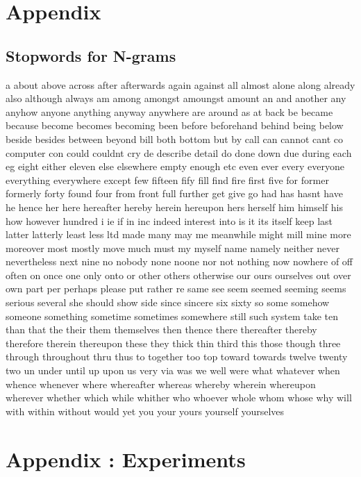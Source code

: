 
\renewcommand{\theequation}{B\arabic{equation}}
\setcounter{equation}{0}
\renewcommand{\thefigure}{B\arabic{figure}}
\setcounter{figure}{0}
\renewcommand{\thetable}{B\arabic{table}}
\setcounter{table}{0}


\clearpage

\thesisappendix

\section{Appendix \label{A}}


\subsection{Stopwords for N-grams}
\label{sec:appendix-stopwords}

a
about
above
across
after
afterwards
again
against
all
almost
alone
along
already
also
although
always
am
among
amongst
amoungst
amount
an
and
another
any
anyhow
anyone
anything
anyway
anywhere
are
around
as
at
back
be
became
because
become
becomes
becoming
been
before
beforehand
behind
being
below
beside
besides
between
beyond
bill
both
bottom
but
by
call
can
cannot
cant
co
computer
con
could
couldnt
cry
de
describe
detail
do
done
down
due
during
each
eg
eight
either
eleven
else
elsewhere
empty
enough
etc
even
ever
every
everyone
everything
everywhere
except
few
fifteen
fify
fill
find
fire
first
five
for
former
formerly
forty
found
four
from
front
full
further
get
give
go
had
has
hasnt
have
he
hence
her
here
hereafter
hereby
herein
hereupon
hers
herself
him
himself
his
how
however
hundred
i
ie
if
in
inc
indeed
interest
into
is
it
its
itself
keep
last
latter
latterly
least
less
ltd
made
many
may
me
meanwhile
might
mill
mine
more
moreover
most
mostly
move
much
must
my
myself
name
namely
neither
never
nevertheless
next
nine
no
nobody
none
noone
nor
not
nothing
now
nowhere
of
off
often
on
once
one
only
onto
or
other
others
otherwise
our
ours
ourselves
out
over
own
part
per
perhaps
please
put
rather
re
same
see
seem
seemed
seeming
seems
serious
several
she
should
show
side
since
sincere
six
sixty
so
some
somehow
someone
something
sometime
sometimes
somewhere
still
such
system
take
ten
than
that
the
their
them
themselves
then
thence
there
thereafter
thereby
therefore
therein
thereupon
these
they
thick
thin
third
this
those
though
three
through
throughout
thru
thus
to
together
too
top
toward
towards
twelve
twenty
two
un
under
until
up
upon
us
very
via
was
we
well
were
what
whatever
when
whence
whenever
where
whereafter
whereas
whereby
wherein
whereupon
wherever
whether
which
while
whither
who
whoever
whole
whom
whose
why
will
with
within
without
would
yet
you
your
yours
yourself
yourselves

\clearpage
\section{Appendix \label{B}: Experiments}


